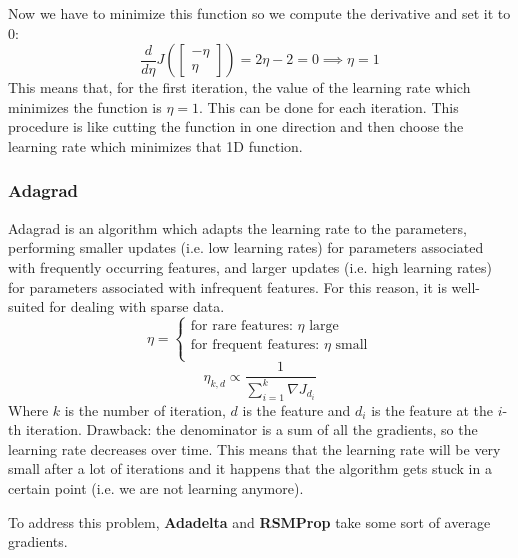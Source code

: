 Now we have to minimize this function so we compute the derivative and set it to 0:
\[
    \dfrac{d}{d\eta} J\left(  
        \begin{bmatrix}
            -\eta\\
            \eta
        \end{bmatrix}
        \right) = 2\eta - 2 = 0 \implies \eta = 1
\]
This means that, for the first iteration, the value of the learning rate which minimizes the function is $\eta = 1$. This can be done for each iteration. 
This procedure is like cutting the function in one direction and then choose the learning rate which minimizes that 1D function. 


\subsubsection{Adagrad}
Adagrad is an algorithm which adapts the learning rate to the parameters, performing smaller updates (i.e. low learning rates) for parameters associated with frequently occurring features, and larger updates (i.e. high learning rates) for parameters associated with infrequent features. For this reason, it is well-suited for dealing with sparse data.\\

\[
    \eta = \begin{cases}
        \text{for rare features: } \eta \text{ large}\\
        \text{for frequent features: } \eta \text{ small}\\
    \end{cases}
\]
\[
    \eta_{k,d} \propto \dfrac{1}{\sum_{i=1}^k \nabla J_{d_i}}    
\]
Where $k$ is the number of iteration, $d$ is the feature and $d_i$ is the feature at the $i$-th iteration. Drawback: the denominator is a sum of all the gradients, so the learning rate decreases over time. This means that the learning rate will be very small after a lot of iterations and it happens that the algorithm gets stuck in a certain point (i.e. we are not learning anymore).

To address this problem, \textbf{Adadelta} and \textbf{RSMProp} take some sort of average gradients.